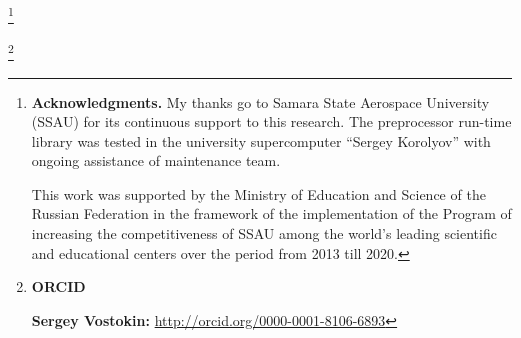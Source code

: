 \RuDate	

%
\newpage



\makeentitle


\thanks{{\bf Acknowledgments.} My thanks go to Samara State Aerospace University (SSAU) for its continuous support to this research. The  preprocessor run-time library was tested in the university supercomputer ``Sergey Korolyov'' with ongoing assistance of maintenance team.

This work was supported by the Ministry of Education and Science of the Russian Federation in the framework of the implementation of the Program of increasing the competitiveness of SSAU among the world's leading scientific and educational centers over the period from  2013  till 2020.
}

\thanks{{\bf ORCID}

{\bf Sergey Vostokin:} \url{http://orcid.org/0000-0001-8106-6893}
}


\EngRef


